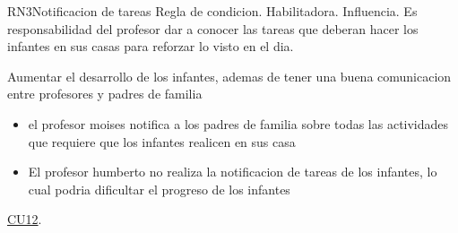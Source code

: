 \begin{BussinesRule}{RN3}{Notificacion de tareas}
	\BRitem[Tipo:] Regla de condicion.
	\BRitem[Clase:] Habilitadora. 
	\BRitem[Nivel:] Influencia. %
	\BRitem[Descripción:] Es responsabilidad del profesor dar a conocer las tareas que deberan hacer los infantes en sus casas para reforzar lo visto en el dia.
 
        \BRitem[Motivacion] Aumentar el desarrollo de los infantes, ademas de tener una buena comunicacion entre profesores y padres de familia
        
                \begin{itemize}
                    \item el profesor moises notifica a los padres de familia sobre todas las actividades que requiere que los infantes realicen en sus casa
                \end{itemize}
	
                \begin{itemize}
                    \item El profesor humberto no realiza la notificacion de tareas de los infantes, lo cual podria dificultar el progreso de los infantes
                \end{itemize}
 
	 \hyperlink{CU12}{CU12}.
\end{BussinesRule}

